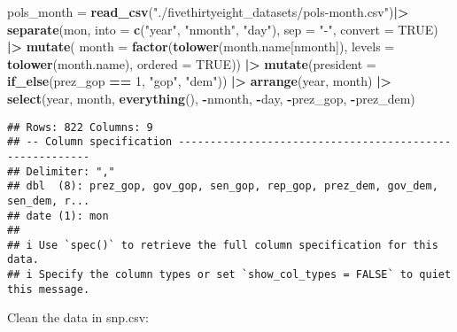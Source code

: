 \documentclass[
]{article}
\newenvironment{Shaded}{\begin{snugshade}}{\end{snugshade}}
\newcommand{\AttributeTok}[1]{\textcolor[rgb]{0.13,0.29,0.53}{#1}}
\newcommand{\ConstantTok}[1]{\textcolor[rgb]{0.56,0.35,0.01}{#1}}
\newcommand{\DecValTok}[1]{\textcolor[rgb]{0.00,0.00,0.81}{#1}}
\newcommand{\FunctionTok}[1]{\textcolor[rgb]{0.13,0.29,0.53}{\textbf{#1}}}
\newcommand{\NormalTok}[1]{#1}
\newcommand{\OtherTok}[1]{\textcolor[rgb]{0.56,0.35,0.01}{#1}}
\newcommand{\SpecialCharTok}[1]{\textcolor[rgb]{0.81,0.36,0.00}{\textbf{#1}}}
\newcommand{\StringTok}[1]{\textcolor[rgb]{0.31,0.60,0.02}{#1}}
\begin{document}
\begin{Shaded}
\begin{Highlighting}[]
\NormalTok{pols\_month }\OtherTok{=}
  \FunctionTok{read\_csv}\NormalTok{(}\StringTok{"./fivethirtyeight\_datasets/pols{-}month.csv"}\NormalTok{)}\SpecialCharTok{|\textgreater{}}
  \FunctionTok{separate}\NormalTok{(mon, }\AttributeTok{into =} \FunctionTok{c}\NormalTok{(}\StringTok{"year"}\NormalTok{, }\StringTok{"nmonth"}\NormalTok{, }\StringTok{"day"}\NormalTok{), }\AttributeTok{sep =} \StringTok{"{-}"}\NormalTok{, }\AttributeTok{convert =} \ConstantTok{TRUE}\NormalTok{) }\SpecialCharTok{|\textgreater{}}
  \FunctionTok{mutate}\NormalTok{(}
    \AttributeTok{month =} \FunctionTok{factor}\NormalTok{(}\FunctionTok{tolower}\NormalTok{(month.name[nmonth]),}
                   \AttributeTok{levels =} \FunctionTok{tolower}\NormalTok{(month.name),}
                   \AttributeTok{ordered =} \ConstantTok{TRUE}\NormalTok{)) }\SpecialCharTok{|\textgreater{}}
  \FunctionTok{mutate}\NormalTok{(}\AttributeTok{president =} \FunctionTok{if\_else}\NormalTok{(prez\_gop }\SpecialCharTok{==} \DecValTok{1}\NormalTok{, }\StringTok{"gop"}\NormalTok{, }\StringTok{"dem"}\NormalTok{)) }\SpecialCharTok{|\textgreater{}}
  \FunctionTok{arrange}\NormalTok{(year, month) }\SpecialCharTok{|\textgreater{}}
  \FunctionTok{select}\NormalTok{(year, month, }\FunctionTok{everything}\NormalTok{(), }\SpecialCharTok{{-}}\NormalTok{nmonth, }\SpecialCharTok{{-}}\NormalTok{day, }\SpecialCharTok{{-}}\NormalTok{prez\_gop, }\SpecialCharTok{{-}}\NormalTok{prez\_dem)}
\end{Highlighting}
\end{Shaded}

\begin{verbatim}
## Rows: 822 Columns: 9
## -- Column specification --------------------------------------------------------
## Delimiter: ","
## dbl  (8): prez_gop, gov_gop, sen_gop, rep_gop, prez_dem, gov_dem, sen_dem, r...
## date (1): mon
## 
## i Use `spec()` to retrieve the full column specification for this data.
## i Specify the column types or set `show_col_types = FALSE` to quiet this message.
\end{verbatim}

Clean the data in snp.csv:
\end{document}
